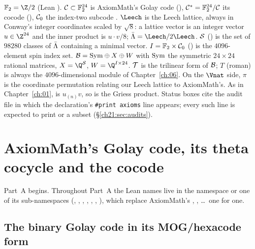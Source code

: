\begin{remark}[Notation]\label{ch21:rem:notation}
$\chXXIF=\Z/2$ (Lean ).  $\mathcal{C}\subset\mathbb{F}_2^{24}$ is AxiomMath's Golay code
(), $\mathcal{C}^*=\mathbb{F}_2^{24}/\mathcal{C}$ its cocode (), $\mathcal{C}_0$ the
index-two subcode .  $\Leech$ is the Leech lattice, always in Conway's integer coordinates
scaled by $\sqrt8$: a lattice vector is an integer vector $u\in\Z^{24}$ and the inner product is
$u\cdot v/8$; $\chXXIL=\Leech/2\Leech$.  $\mathcal{S}$ () is the set of $98280$ classes of
$\bar{\Lambda}$ containing a minimal vector.  $I=\mathbb{F}_2\times\mathcal{C}_0$ () is the
$4096$-element spin index set.  $\mathcal{B}=\mathrm{Sym}\oplus X\oplus W$ with $\mathrm{Sym}$ the symmetric
$24\times24$ rational matrices, $X=\Q^{\chXXIS}$, $W=\Q^{I\times24}$.  $\mathcal{T}$ is the trilinear form of
$\mathcal{B}$; $T$ (roman) is always the $4096$-dimensional module of Chapter~\ref{ch:06}.  On the $\Vnat$
side, $\pi$ is the coordinate permutation  relating our Leech lattice to AxiomMath's.  As in
Chapter~\ref{ch:01},  is $u_{(n)}v$, so  is the Griess
product.  Status boxes cite the audit file in which the declaration's \texttt{\#print axioms} line
appears; every such line is expected to print  or a subset
(\S\ref{ch21:sec:audits}).
\end{remark}

\section{AxiomMath's Golay code, its theta cocycle and the cocode}\label{ch21:sec:golay}

Part~A begins.  Throughout Part~A the Lean names live in the namespace
 or one of its sub-namespaces (, ,
, , , , ),
which replace AxiomMath's , , \dots\ one for one.

\subsection{The binary Golay code in its MOG/hexacode form}

